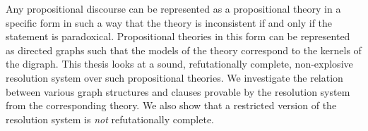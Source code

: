 Any propositional discourse can be represented as a propositional theory in a specific form in such a way that the theory is inconsistent if and only if the statement is paradoxical.
Propositional theories in this form can be represented as directed graphs such that the models of the theory correspond to the kernels of the digraph.
This thesis looks at a sound, refutationally complete, non-explosive resolution system over such propositional theories.
We investigate the relation between various graph structures and clauses provable by the resolution system from the corresponding theory.
We also show that a restricted version of the resolution system is \textit{not} refutationally complete.
